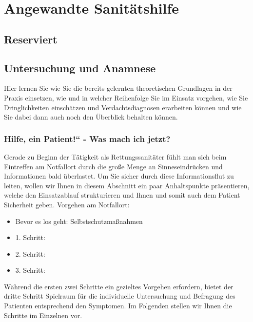 \chapter{Angewandte Sanitätshilfe ---
}


\minitoc

\section{Reserviert}\label{topic:lagerungsarten}



\section{Untersuchung und Anamnese}

Hier lernen Sie wie Sie die bereits gelernten theoretischen Grundlagen in
der Praxis einsetzen, wie und in welcher Reihenfolge Sie im Einsatz
vorgehen, wie Sie Dringlichkeiten einsch\"atzen und Verdachtsdiagnosen
erarbeiten können und wie Sie dabei dann auch noch den Überblick
behalten können.





\subsection{{\quotedblbase}Hilfe, ein Patient!{\textquotedblleft} - Was
mach{\textquotesingle} ich jetzt?}

Gerade zu Beginn der T\"atigkeit als Rettungssanit\"ater fühlt man sich beim Eintreffen am Notfallort durch die große Menge an Sinneseindrücken und Informationen bald überlastet. Um Sie sicher durch diese Informationsflut zu leiten, wollen wir Ihnen in diesem Abschnitt ein paar Anhaltspunkte pr\"asentieren, welche den Einsatzablauf strukturieren und Ihnen und somit auch dem Patient Sicherheit geben.
Vorgehen am Notfallort:
\begin{itemize}
    \item Bevor es los geht: Selbstschutzmaßnahmen
    \item 1. Schritt: 
    \item 2. Schritt: 
    \item 3. Schritt: 
\end{itemize}
W\"ahrend die ersten zwei Schritte ein gezieltes Vorgehen erfordern, bietet der dritte Schritt Spielraum für die individuelle Untersuchung und Befragung des Patienten entsprechend den Symptomen. Im Folgenden stellen wir Ihnen die Schritte im Einzelnen vor.

